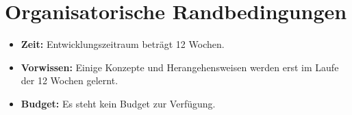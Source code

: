 
\section{Organisatorische Randbedingungen}
\begin{itemize}
    \item \textbf{Zeit:} Entwicklungszeitraum beträgt 12 Wochen. 
    \item \textbf{Vorwissen:} Einige Konzepte und Herangehensweisen werden erst im Laufe der 12 Wochen gelernt.
    \item \textbf{Budget:} Es steht kein Budget zur Verfügung.

\end{itemize}



